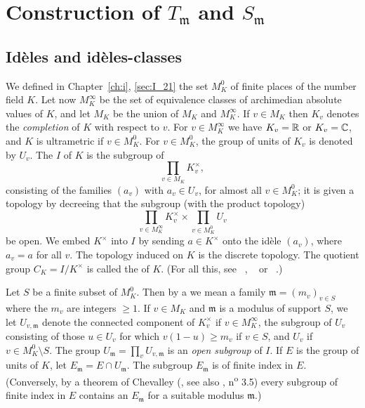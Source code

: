 \section{Construction of \texorpdfstring{$T_{\mathfrak{m}}$}{Tm} and
\texorpdfstring{$S_{\mathfrak{m}}$}{Sm}}

\subsection{Idèles and idèles-classes}
\label{sec:II_21}
We defined in Chapter~\ref{ch:i}, \ref{sec:I_21} the set $M_K^0$ of finite
places of the number field $K$. Let now $M_K^\infty$
be the set of equivalence classes of archimedian absolute values of $K$, and
let $M_K$ be the union of $M_K$ and $M_K^\infty$. If $v \in
M_K$ then $K_v$ denotes the \emph{completion} of $K$ with respect to $v$. For
$v \in M_K^\infty$ we have $K_v = \mathbb{R}$ or $K_v = \mathbb{C}$, and $K$ is ultrametric if
$v \in M_K^0$. For $v \in M_K^0$, the group of units of $K_v$ is denoted by
$U_v$. The  $I$
of $K$ is the subgroup of
\[
	\prod_{v \in M_K} K_v^\times,
\]
consisting of the families $(a_v)$ with $a_v \in U_v$, for almost all $v \in
M_K^0$; it is given a topology by decreeing that the subgroup (with the product
topology)
\[
	\prod_{v \in M_K^\infty} K_v^\times \times \prod_{v \in M_K^0} U_v
\]
be open. We embed $K^\times$ into $I$ by sending $a \in K^\times$ onto the
idèle $(a_v)$, where $a_v = a$ for all $v$. The topology induced on $K$ is the
discrete topology. The quotient group $C_K = I/K^\times$ is called the  of
$K$.
(For all this, see \citeauthor{6}~\cite{6}, \citeauthor{13}~\cite{13} or
\citeauthor{44}~\cite{44}.)

Let $S$ be a finite subset of $M_K^0$.
\dpage
Then by a  we mean a family $\mathfrak{m} =
(m_v)_{v\in S}$ where the $m_v$ are integers $\ge 1$.  If $v \in M_K$ and
$\mathfrak{m}$ is a modulus of support $S$, we let $U_{v, \mathfrak{m}}$%
 denote the connected component of
$K_v^\times$ if $v \in M_K^\infty$, the subgroup of $U_v$ consisting of those
$u \in U_v$ for which $v(1-u) \ge m_v$ if $v \in S$, and $U_v$ if $v \in M_K^0
\setminus S$. The group $U_{\mathfrak{m}} = \prod_{v} U_{v, \mathfrak{m}}$ is
an \emph{open subgroup} of $I$.  If $E$ is the group of units of $K$, let
$E_{\mathfrak{m}} = E \cap U_{\mathfrak{m}}$. The
subgroup $E_{\mathfrak{m}}$ is of finite index in $E$.
(Conversely, by a theorem of Chevalley (\cite{8}, see also \cite{24},
n\textsuperscript{o} 3.5) every subgroup of finite index in $E$ contains an
$E_{\mathfrak{m}}$ for a suitable modulus $\mathfrak{m}$.)


